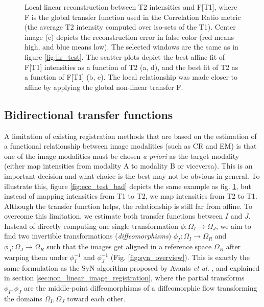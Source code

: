 \begin{figure}[t]
    \caption{Local linear reconstruction between T2 intensities and F[T1], where F is the global transfer function used in the Correlation Ratio metric (the average T2 intensity computed over iso-sets of the T1). Center image (c) depicts the reconstruction error in false color (red means high, and blue means low). The selected windows are the same as in figure \ref{fig:llr_test}. The scatter plots depict the best affine fit of F[T1] intensities as a function of T2 (a, d), and the best fit of T2 as a function of F[T1] (b, e). The local relationship was made closer to affine by applying the global non-linear transfer F.}
\label{fig:ecc_test_good}
\end{figure}
\subsection{Bidirectional transfer functions}

A limitation of existing registration methods that are based on the estimation of a functional relationship between image modalities (such as CR and EM\cite{Roche1998, Roche2000, Arce-santana2014}) is that one of the image modalities must be chosen \emph{a priori} as the target modality (either map intensities from modality A to modality B or viceversa). This is an important decision and what choice is the best may not be obvious in general. To illustrate this, figure \ref{fig:ecc_test_bad} depicts the same example as fig. \ref{fig:ecc_test_good}, but instead of mapping intensities from T1 to T2, we map intensities from T2 to T1. Although the transfer function helps, the relationship is still far from affine. To overcome this limitation, we estimate both transfer functions between $I$ and $J$. Instead of directly computing one single transformation $\phi:\Omega_{I} \rightarrow \Omega_{J}$, we aim to find two invertible transformations (\emph{diffeomorphisms}) $\phi_{I}:\Omega_{I}\rightarrow \Omega_{R}$ and $\phi_{J}:\Omega_{J}\rightarrow \Omega_{R}$ such that the images get aligned in a reference space $\Omega_{R}$ after warping them under $\phi_{I}^{-1}$ and $\phi_{J}^{-1}$ (Fig. \ref{fig:syn_overview}). This is exactly the same formulation as the SyN algorithm proposed by Avants {\it et al.} \cite{Avants2011}, and explained in section \ref{sec:non_linear_image_registration}, where the partial transforms $\phi_{I}, \phi_{J}$ are the middle-point diffeomorphisms of a diffeomorphic flow transforming the domains $\Omega_{I}, \Omega_{J}$ toward each other.\\


